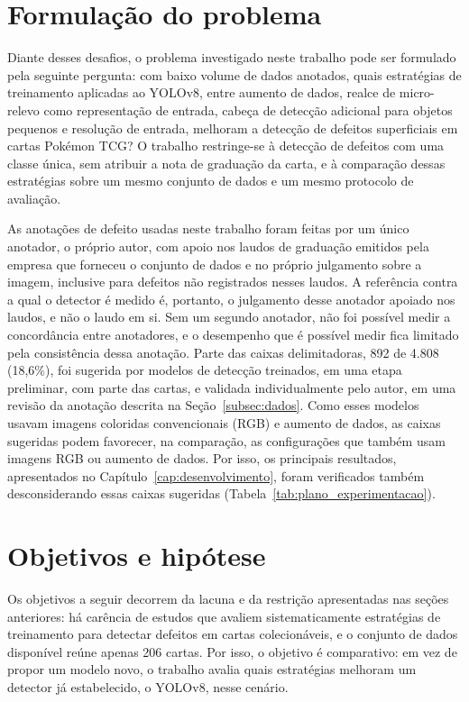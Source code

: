 \documentclass[
    12pt,                %
    openright,           %
    oneside,             %
    a4paper,             %
    english,             %
    brazil               %
]{abntex2}
\begin{document}
\section{Formulação do problema}
\label{sec:formulacao}

Diante desses desafios, o problema investigado neste trabalho pode ser
formulado pela seguinte pergunta: com baixo volume de dados
anotados, quais estratégias de treinamento aplicadas ao YOLOv8, entre
aumento de dados, realce de micro-relevo como representação de entrada,
cabeça de detecção adicional para objetos pequenos e resolução de
entrada, melhoram a detecção de defeitos superficiais em cartas
Pokémon TCG? O trabalho restringe-se à detecção de defeitos com uma
classe única, sem atribuir a nota de graduação da carta, e à
comparação dessas estratégias sobre um mesmo conjunto de dados e um
mesmo protocolo de avaliação.

As anotações de defeito usadas neste trabalho foram feitas por um único
anotador, o próprio autor, com apoio nos laudos de graduação emitidos
pela empresa que forneceu o conjunto de dados e no próprio julgamento
sobre a imagem, inclusive para defeitos não registrados nesses laudos.
A referência contra a qual o detector é medido é, portanto, o
julgamento desse anotador apoiado nos laudos, e não o laudo em si. Sem
um segundo anotador, não foi possível medir a concordância entre
anotadores, e o desempenho que é possível medir fica limitado pela
consistência dessa anotação. Parte das caixas delimitadoras, 892 de
4.808 (18,6\%), foi sugerida por modelos de detecção treinados, em uma
etapa preliminar, com parte das cartas, e validada individualmente pelo autor, em
uma revisão da anotação descrita na Seção~\ref{subsec:dados}. Como
esses modelos usavam imagens coloridas convencionais (RGB) e aumento de
dados, as caixas sugeridas podem favorecer, na comparação, as
configurações que também usam imagens RGB ou aumento de dados. Por isso,
os principais resultados, apresentados no Capítulo~\ref{cap:desenvolvimento}, foram verificados
também desconsiderando essas caixas sugeridas
(Tabela~\ref{tab:plano_experimentacao}).

\section{Objetivos e hipótese}
\label{sec:objetivos}

Os objetivos a seguir decorrem da lacuna e da restrição apresentadas
nas seções anteriores: há carência de estudos que avaliem
sistematicamente estratégias de treinamento para detectar defeitos em
cartas colecionáveis, e o conjunto de dados disponível reúne apenas 206
cartas. Por isso, o objetivo é comparativo: em vez de propor um modelo
novo, o trabalho avalia quais estratégias melhoram um detector já
estabelecido, o YOLOv8, nesse cenário.
\end{document}
